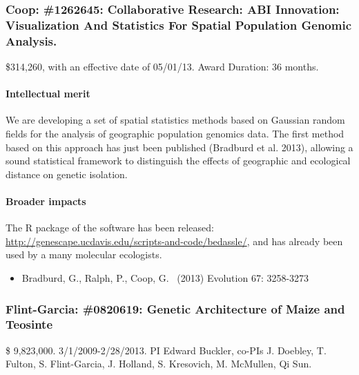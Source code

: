 \subsubsection*{Coop: \#1262645: Collaborative Research: ABI Innovation: Visualization And Statistics For Spatial Population Genomic Analysis. }
\$314,260, with an effective date of 05/01/13. Award Duration: 36 months.

\paragraph*{Intellectual merit}  We are developing a set of spatial statistics methods based on Gaussian random fields for the analysis of geographic population genomics data. The first method based on this approach has just been published (Bradburd et al. 2013), allowing a sound statistical framework to distinguish the effects of geographic and ecological distance on genetic isolation. \\
\paragraph*{Broader impacts} The R package of the software has been released: \url{http://genescape.ucdavis.edu/scripts-and-code/bedassle/}, and has already been used by a many molecular ecologists. 

\begin{itemize}[noitemsep]
\item Bradburd, G., Ralph, P., Coop, G.  (2013) Evolution 67: 3258-3273
\end{itemize}

\subsubsection*{Flint-Garcia: \#0820619: Genetic Architecture of Maize and Teosinte}
\$ 9,823,000. 3/1/2009-2/28/2013. PI Edward Buckler, co-PIs J. Doebley, T. Fulton, S. Flint-Garcia, J. Holland, S. Kresovich, M. McMullen, Qi Sun. 

